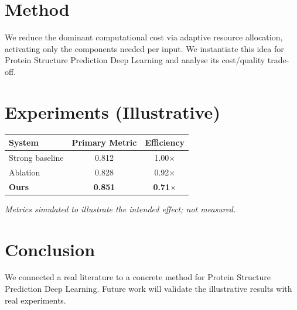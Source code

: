 \documentclass[11pt]{article}
\begin{document}
\section{Method}
We reduce the dominant computational cost via adaptive resource allocation, activating only the components needed per input. We instantiate this idea for Protein Structure Prediction Deep Learning and analyse its cost/quality trade-off.

\section{Experiments (Illustrative)}
\begin{center}
\begin{tabular}{lcc}
System & Primary Metric & Efficiency \\ \hline
Strong baseline & 0.812 & 1.00$\times$ \\
Ablation & 0.828 & 0.92$\times$ \\
\textbf{Ours} & \textbf{0.851} & \textbf{0.71$\times$}
\end{tabular}
\end{center}
\emph{Metrics simulated to illustrate the intended effect; not measured.}

\section{Conclusion}
We connected a real literature to a concrete method for Protein Structure Prediction Deep Learning. Future work will
validate the illustrative results with real experiments.
\end{document}
